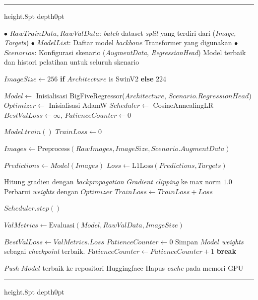{
	\vspace{2ex}
	\hrule height.8pt depth0pt \kern5pt
	
	\begin{algorithmic}[1]
		\Input 
		\Statex $\bullet$ $RawTrainData, RawValData$: \textit{batch} dataset \textit{split} yang terdiri dari (\textit{Image, Targets})
		\Statex $\bullet$ $ModelList$: Daftar model \textit{backbone} Transformer yang digunakan
		\Statex $\bullet$ $Scenarios$: Konfigurasi skenario (\textit{AugmentData}, \textit{RegressionHead})
		\Output Model terbaik dan histori pelatihan untuk seluruh skenario
		
		\State $ImageSize \gets 256$ \textbf{if} $Architecture$ is SwinV2 \textbf{else} $224$
		
		\State $Model \gets$ Inisialisasi BigFiveRegressor($Architecture$, $Scenario.RegressionHead$)
		\State $Optimizer \gets$ Inisialisasi AdamW
		\State $Scheduler \gets$ CosineAnnealingLR
		\State $BestValLoss \gets \infty$, $PatienceCounter \gets 0$
		
		\State $Model.train()$
		\State $TrainLoss \gets 0$
		
		\State {}
		\State $Images \gets \text{Preprocess}(RawImages, ImageSize, Scenario.AugmentData)$ 
		
		\State $Predictions \gets Model(Images)$
		\State $Loss \gets \text{L1Loss}(Predictions, Targets)$
		
		\State Hitung gradien dengan \textit{backpropagation}
		\State \textit{Gradient clipping} ke max norm $1.0$
		\State Perbarui \textit{weights} dengan $Optimizer$
		\State $TrainLoss \gets TrainLoss + Loss$
		\EndFor
		
		\State $Scheduler.step()$
		
		\State $ValMetrics \gets \text{Evaluasi}(Model, RawValData, ImageSize)$ 
		
		\State $BestValLoss \gets ValMetrics.Loss$
		\State $PatienceCounter \gets 0$
		\State Simpan $Model$ \textit{weights} sebagai \textit{checkpoint} terbaik.
		\Else
		\State $PatienceCounter \gets PatienceCounter + 1$
		\State \textbf{break} 
		\EndIf
		\EndIf
		\EndFor
		
		\State \textit{Push} $Model$ terbaik ke repositori Huggingface
		\State Hapus \textit{cache} pada memori GPU
		\EndFor
		\EndFor
	\end{algorithmic}
	
	\nopagebreak %
	\kern2pt\hrule height.8pt depth0pt \kern15pt 
	\nopagebreak
	
	\label{alg:training-loop}
}


